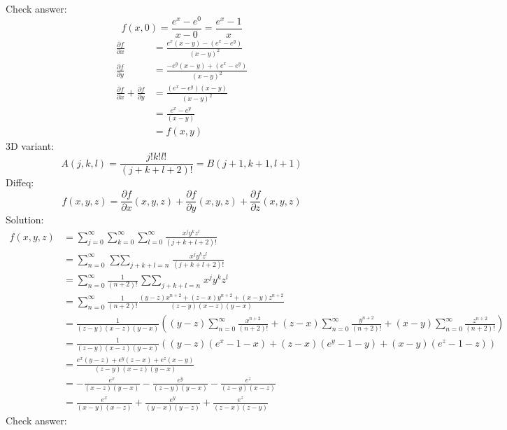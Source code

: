 \documentclass{article}
\begin{document}
Check answer:
\[f(x, 0) = \frac{e^x-e^0}{x-0} = \frac{e^x-1}{x}\]
\begin{align*}
  \frac{\partial f}{\partial x} &= \frac{e^x(x-y)-(e^x-e^y)}{(x-y)^2} \\
  \frac{\partial f}{\partial y} &= \frac{-e^y(x-y)+(e^x-e^y)}{(x-y)^2} \\
  \frac{\partial f}{\partial x}+\frac{\partial f}{\partial y} &= \frac{(e^x-e^y)(x-y)}{(x-y)^2} \\
  &= \frac{e^x-e^y}{(x-y)} \\
  &= f(x, y)
\end{align*}
\newpage
3D variant:
\[A(j, k, l) = \frac{j!k!l!}{(j+k+l+2)!} = B(j+1, k+1, l+1)\]
Diffeq:
\[
f(x, y, z)
= \frac{\partial f}{\partial x}(x, y, z)
+ \frac{\partial f}{\partial y}(x, y, z)
+ \frac{\partial f}{\partial z}(x, y, z)
\]
Solution:
\begin{align*}
  f(x, y, z) &= \sum_{j=0}^\infty\sum_{k=0}^\infty\sum_{l=0}^\infty\frac{x^jy^kz^l}{(j+k+l+2)!} \\
  &= \sum_{n=0}^\infty\mathop{\sum\sum}_{j+k+l=n}\frac{x^jy^kz^l}{(j+k+l+2)!} \\
  &= \sum_{n=0}^\infty\frac{1}{(n+2)!}\mathop{\sum\sum}_{j+k+l=n}x^jy^kz^l \\
  &= \sum_{n=0}^\infty\frac{1}{(n+2)!}\frac{(y-z)x^{n+2}+(z-x)y^{n+2}+(x-y)z^{n+2}}{(z-y)(x-z)(y-x)} \\
  &= \frac{1}{(z-y)(x-z)(y-x)}\left(
  (y-z)\sum_{n=0}^\infty\frac{x^{n+2}}{(n+2)!} +
  (z-x)\sum_{n=0}^\infty\frac{y^{n+2}}{(n+2)!} +
  (x-y)\sum_{n=0}^\infty\frac{z^{n+2}}{(n+2)!}
  \right) \\
  &= \frac{1}{(z-y)(x-z)(y-x)}((y-z)(e^x-1-x)+(z-x)(e^y-1-y)+(x-y)(e^z-1-z)) \\
  &= \frac{e^x(y-z)+e^y(z-x)+e^z(x-y)}{(z-y)(x-z)(y-x)} \\
  &= -\frac{e^x}{(x-z)(y-x)}-\frac{e^y}{(z-y)(y-x)}-\frac{e^z}{(z-y)(x-z)} \\
  &= \frac{e^x}{(x-y)(x-z)}+\frac{e^y}{(y-x)(y-z)}+\frac{e^z}{(z-x)(z-y)}
\end{align*}
Check answer:
\end{document}
